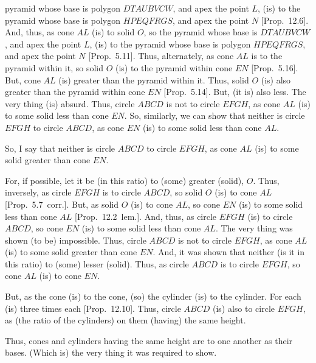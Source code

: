\begin{Parallel}{}{}
{pyramid whose base is polygon $DTAUBVCW$, and apex the point $L$, (is) to  the pyramid whose base is
polygon $HPEQFRGS$, and apex the point $N$ [Prop.~12.6]. And, thus, as cone $AL$ (is)
to solid $O$, so the pyramid whose base is $DTAUBVCW$, and apex the point $L$, (is) to  the pyramid whose base is
polygon $HPEQFRGS$, and apex the point $N$ [Prop.~5.11]. Thus, alternately, as cone $AL$ is to the pyramid within it, so solid $O$
(is) to the pyramid within cone $EN$ [Prop.~5.16]. But, cone $AL$ (is) greater than the
pyramid within it. Thus, solid $O$ (is) also greater than the pyramid within cone $EN$ [Prop.~5.14]. But,
(it is) also less. The very thing (is) absurd. Thus, circle $ABCD$ is not to circle $EFGH$, as cone $AL$
(is) to some solid less than cone $EN$. So, similarly, we can show that neither is circle $EFGH$
to circle $ABCD$, as cone $EN$ (is) to some solid less than cone $AL$.

So, I say that neither is circle $ABCD$ to circle $EFGH$, as cone $AL$ (is) to some solid greater than
cone $EN$.

For, if possible, let it be (in this ratio) to (some) greater (solid), $O$. Thus, inversely, as circle $EFGH$ is to circle
$ABCD$, so solid $O$ (is) to cone $AL$ [Prop.~5.7~corr.]. But, as solid $O$ (is) to cone $AL$, so cone $EN$ (is) to some
solid less than cone $AL$ [Prop.~12.2~lem.].  And, thus, as circle $EFGH$
(is)  to circle $ABCD$, so cone $EN$ (is) to some solid less than cone $AL$. The very thing was shown
(to be) impossible. Thus, circle $ABCD$ is not to circle $EFGH$, as cone $AL$ (is) to some solid greater than
cone $EN$. And, it was shown that neither (is it in this ratio) to (some) lesser (solid). Thus, as circle $ABCD$ is to circle
$EFGH$, so cone $AL$ (is) to cone $EN$.

But, as the cone (is) to the cone, (so) the cylinder (is) to the cylinder. For each (is) three times each [Prop.~12.10]. Thus, circle $ABCD$ (is) also to circle $EFGH$, as  (the ratio of the cylinders) on them (having) the
same height.

Thus, cones and cylinders having the same height are to one another as their bases. (Which is) the very thing
it was required to show.}
\end{Parallel}

